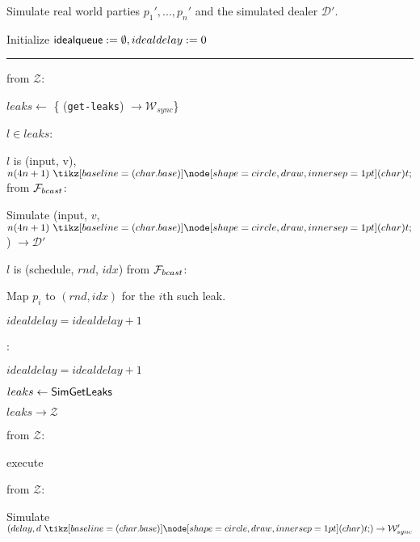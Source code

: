 \begin{bbox}[title={Simulator $\mathcal{S}_{bracha} (\mathcal{D}, \mathcal{P}, \Delta)$}]

Simulate real world parties $p_1',...,p_n'$ and the simulated dealer $\mathcal{D}'$.

Initialize ${\mathsf {idealqueue}} := \emptyset, idealdelay := 0$

\vspace{2mm} \hrule \vspace{2mm}

\OnInput {} from $\mathcal{Z}$:
	\begin{renumerate}
	\item $leaks \leftarrow$ \{ \Send (\texttt{get-leaks}) $\rightarrow \mathcal{W}_{sync}$\}

	\item \For $l \in leaks$:
		\begin{renumerate}
		\item \If $l$ is (input, v), $n(4n+1) \token$ from $\mathcal{F}_{bcast}$:

			\quad Simulate (input, $v$, $n(4n+1) \token$) $\rightarrow \mathcal{D}'$ 

		\item \Else \If $l$ is (schedule, $rnd$, $idx$) from $\mathcal{F}_{bcast}$:

			\quad Map $p_i$ to $(rnd,idx)$ for the $i$th such leak.

			\quad $idealdelay = idealdelay + 1$

		\item \Else:

			\quad $idealdelay = idealdelay + 1$
		\end{renumerate}
	\item $leaks \leftarrow {\mathsf {SimGetLeaks}}$

	\item \Send $leaks \rightarrow \mathcal{Z}$
	\end{renumerate}

\OnInput {} from $\mathcal{Z}$:
	\begin{renumerate}
	\item execute \msf{Poll}
	\end{renumerate}

\OnInput {} from $\mathcal{Z}$:
	\begin{renumerate}
	\item Simulate $(delay, d \token) \rightarrow \mathcal{W}_{sync}'$


\end{renumerate}
\end{bbox}
